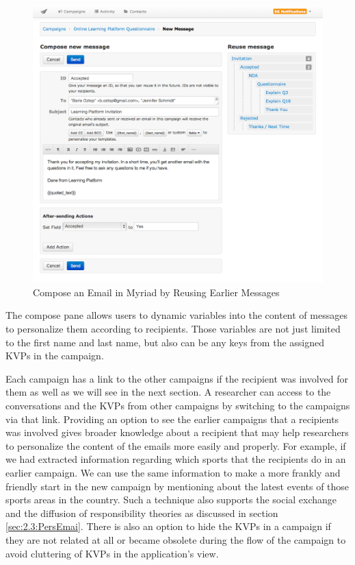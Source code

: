 \begin{figure}[htbp]
	\centering
	\includegraphics[width=1.00\textwidth]{imgs/ComposeEmail.png}
	\caption[Compose an Email in Myriad by Reusing Earlier Messages]{Compose an Email in Myriad by Reusing Earlier Messages}
	\label{fig:ComposeEmail}
\end{figure}

The compose pane allows users to dynamic variables into the content of messages to personalize them according to recipients. Those variables are not just limited to the first name and last name, but also can be any keys from the assigned \ac{KVP}s in the campaign.
\vspace{1cm}

Each campaign has a link to the other campaigns if the recipient was involved for them as well as we will see in the next section. A researcher can access to the conversations and the \ac{KVP}s from other campaigns by switching to the campaigns via that link. Providing an option to see the earlier campaigns that a recipients was involved gives broader knowledge about a recipient that may help researchers to personalize the content of the emails more easily and properly. For example, if we had extracted information regarding which sports that the recipients do in an earlier campaign. We can use the same information to make a more frankly and friendly start in the new campaign by mentioning about the latest events of those sports areas in the country. Such a technique also supports the social exchange and the diffusion of responsibility theories as discussed in section \ref{sec:2.3:PersEmai}. There is also an option to hide the \ac{KVP}s in a campaign if they are not related at all or became obsolete during the flow of the campaign to avoid cluttering of \ac{KVP}s in the application's view.
\vspace{1cm}

